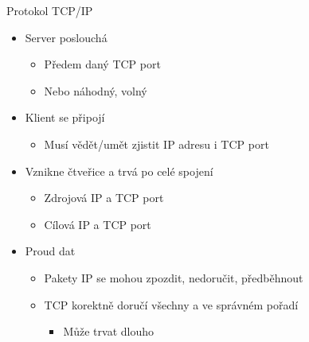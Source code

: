 \begin{frame}{Protokol TCP/IP}

  \begin{itemize}
    \item Server poslouchá
    \begin{itemize}
      \item Předem daný TCP port
      \item Nebo náhodný, volný
    \end{itemize}

    \pause

    \item Klient se připojí
    \begin{itemize}
      \item Musí vědět/umět zjistit IP adresu i TCP port
    \end{itemize}

    \pause

    \item Vznikne čtveřice a trvá po celé spojení
    \begin{itemize}
      \item Zdrojová IP a TCP port
      \item Cílová IP a TCP port
    \end{itemize}

    \pause

    \item Proud dat

    \pause

    \begin{itemize}
      \item Pakety IP se mohou zpozdit, nedoručit, předběhnout
      \item TCP korektně doručí všechny a ve správném pořadí
      \begin{itemize}
	\item Může trvat dlouho
      \end{itemize}
    \end{itemize}
  \end{itemize}

\end{frame}

\ifpcdirlinux

\fi

